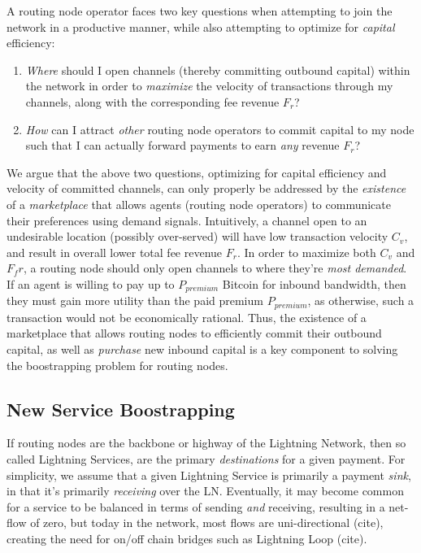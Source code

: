 \documentclass[10pt,a4paper]{article}
\theoremstyle{definition}
\begin{document}
A routing node operator faces two key questions when attempting to join the network in a
productive manner, while also attempting to optimize for \emph{capital}
efficiency: 

\begin{enumerate}
        \item \emph{Where} should I open channels (thereby committing
            outbound capital) within the network in order to \emph{maximize}
            the velocity of transactions through my channels, along with the corresponding fee
            revenue $F_r$? 

        \item \emph{How} can I attract \emph{other} routing node operators to commit
            capital to my node such that I can actually forward payments to earn
            \emph{any} revenue $F_r$?
\end{enumerate}

We argue that the above two questions, optimizing for capital efficiency and
velocity of committed channels, can only properly be addressed by the
\emph{existence} of a \emph{marketplace} that allows agents (routing node operators) to
communicate their preferences using demand signals. Intuitively, a channel open
to an undesirable location (possibly over-served) will have low transaction
velocity $C_{v}$, and result in overall lower total fee revenue $F_r$. In
order to maximize both $C_v$ and $F_fr$, a routing node should only open
channels to where they're \emph{most demanded}. If an agent is willing to pay
up to $P_{premium}$ Bitcoin for inbound bandwidth, then they must gain
more utility than the paid premium $P_{premium}$, as otherwise, such a
transaction would not be economically rational. Thus, the existence of a
marketplace that allows routing nodes to efficiently commit their outbound
capital, as well as \emph{purchase} new inbound capital is a key component to
solving the boostrapping problem for routing nodes. 


\subsection{New Service Boostrapping}

If routing nodes are the backbone or highway of the Lightning Network, then
so called Lightning Services, are the primary \emph{destinations} for a given
payment. For simplicity, we assume that a given Lightning Service is primarily
a payment \emph{sink}, in that it's primarily \emph{receiving} over the LN. Eventually,
it may become common for a service to be balanced in terms of sending
\emph{and} receiving, resulting in a net-flow of zero, but today in the
network, most flows are uni-directional (cite), creating the need for on/off
chain bridges such as Lightning Loop (cite).
\end{document}
